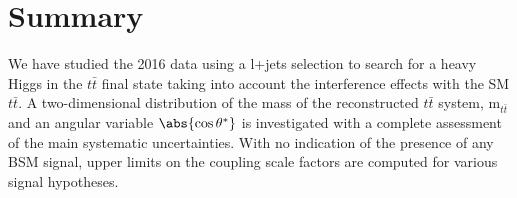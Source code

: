 \section{Summary}
We have studied the 2016 data using a l+jets selection to search for a heavy Higgs in the $t\bar t$ final state taking into account the interference effects with the SM $t\bar t$. A two-dimensional distribution of the mass of the reconstructed $t\bar t$ system, m$_{t\bar t}$ and an angular variable $\abs{\cos\theta^*}$ is investigated with a complete assessment of the main systematic uncertainties. With no indication of the presence of any BSM signal, upper limits on the coupling scale factors are computed for various signal hypotheses.




\clearpage{\pagestyle{empty}\cleardoublepage}
